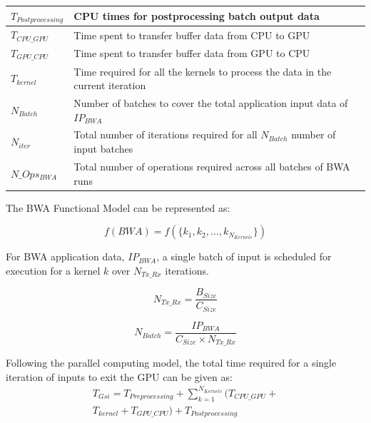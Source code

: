 \documentclass[conference]{IEEEtran}
\begin{document}
\begin{table}[!t]
{\begin{tabular}{| l | >{\arraybackslash}m{2.5in} |}
\hline
$T_{Postprocessing}$ & CPU times for postprocessing batch output data\\
\hline
$T_{CPU\_GPU}$ & Time spent to transfer buffer data from CPU to GPU\\
\hline
$T_{GPU\_CPU}$ & Time spent to transfer buffer data from GPU to CPU\\
\hline
$T_{kernel}$ & Time required for all the kernels to process the data in the current iteration\\
\hline
$N_{Batch}$ & Number of batches to cover the total application input data of $IP_{BWA}$\\
\hline
$N_{iter}$ & Total number of iterations required for all $N_{Batch}$ number of input batches\\
\hline
$N\_Ops_{BWA}$ & Total number of operations required across all batches of BWA runs\\
\hline
\end{tabular}
}
\end{table}


\par
The BWA Functional Model can be represented as: 

{\scriptsize
    \begin{equation}
    f(BWA) = f(\{k_1, k_2, \dots, k_{N_{Kernels}} \})
    \end{equation}
}%

For BWA application data, $IP_{BWA}$, a single batch of input is scheduled for execution for a kernel $k$ over $N_{Tx\_Rx}$ iterations.

{\scriptsize
    \begin{equation}
    N_{Tx\_Rx} = \frac{B_{Size}}{C_{Size}} 
    \end{equation}
}%

{\scriptsize
    \begin{equation}
    N_{Batch} = \frac{IP_{BWA}}{C_{Size} \times N_{Tx\_Rx}}
    \end{equation}
}%

Following the parallel computing model, the total time required for a single iteration of inputs to exit the GPU can be given as:
{\scriptsize
    \begin{equation}
    \begin{split}
    T_{Gsi} = T_{Preprocessing} + \sum_{k = 1}^{N_{Kernels}}(T_{CPU\_GPU} + \\ T_{kernel} + T_{GPU\_CPU}) + T_{Postprocessing}
    \end{split}
    \end{equation}
}%
\end{document}
